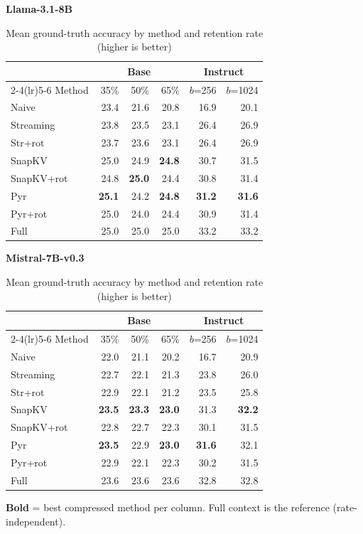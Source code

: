 \documentclass[10pt,letterpaper]{article}
\begin{document}
\begin{table}[H]
\centering
\small
\captionsetup{justification=centering}
\caption{Mean ground-truth accuracy by method and retention rate (higher is better)}
\label{tab:gt-allrates}
\begin{minipage}[t]{0.49\textwidth}
\centering
\textbf{Llama-3.1-8B}\\[0.4em]
\begin{tabular}{@{}lrrrrr@{}}
\toprule
& \multicolumn{3}{c}{Base} & \multicolumn{2}{c}{Instruct}\\
\cmidrule(lr){2-4}\cmidrule(lr){5-6}
Method & 35\% & 50\% & 65\% & $b$=256 & $b$=1024\\
\midrule
Naive      & 23.4 & 21.6 & 20.8 & 16.9 & 20.1\\
Streaming  & 23.8 & 23.5 & 23.1 & 26.4 & 26.9\\
Str+rot    & 23.7 & 23.6 & 23.1 & 26.4 & 26.9\\
SnapKV     & 25.0 & 24.9 & \textbf{24.8} & 30.7 & 31.5\\
SnapKV+rot & 24.8 & \textbf{25.0} & 24.4 & 30.8 & 31.4\\
Pyr        & \textbf{25.1} & 24.2 & \textbf{24.8} & \textbf{31.2} & \textbf{31.6}\\
Pyr+rot    & 25.0 & 24.0 & 24.4 & 30.9 & 31.4\\
\midrule
Full       & 25.0 & 25.0 & 25.0 & 33.2 & 33.2\\
\bottomrule
\end{tabular}
\end{minipage}%
\hfill
\begin{minipage}[t]{0.49\textwidth}
\centering
\textbf{Mistral-7B-v0.3}\\[0.4em]
\begin{tabular}{@{}lrrrrr@{}}
\toprule
& \multicolumn{3}{c}{Base} & \multicolumn{2}{c}{Instruct}\\
\cmidrule(lr){2-4}\cmidrule(lr){5-6}
Method & 35\% & 50\% & 65\% & $b$=256 & $b$=1024\\
\midrule
Naive      & 22.0 & 21.1 & 20.2 & 16.7 & 20.9\\
Streaming  & 22.7 & 22.1 & 21.3 & 23.8 & 26.0\\
Str+rot    & 22.9 & 22.1 & 21.2 & 23.5 & 25.8\\
SnapKV     & \textbf{23.5} & \textbf{23.3} & \textbf{23.0} & 31.3 & \textbf{32.2}\\
SnapKV+rot & 22.8 & 22.7 & 22.3 & 30.1 & 31.5\\
Pyr        & \textbf{23.5} & 22.9 & \textbf{23.0} & \textbf{31.6} & 32.1\\
Pyr+rot    & 22.9 & 22.1 & 22.3 & 30.2 & 31.5\\
\midrule
Full       & 23.6 & 23.6 & 23.6 & 32.8 & 32.8\\
\bottomrule
\end{tabular}
\end{minipage}
\par\smallskip
\textbf{Bold} = best compressed method per column. Full context is the reference (rate-independent).
\end{table}
\end{document}

